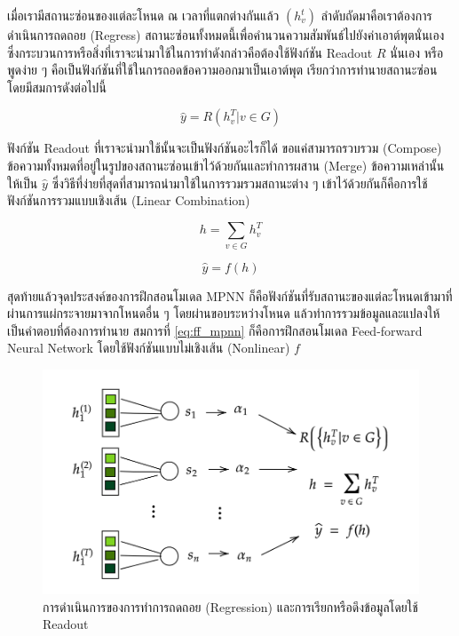 เมื่อเรามีสถานะซ่อนของแต่ละโหนด ณ เวลาที่แตกต่างกันแล้ว $(h^{t}_{v})$ ลำดับถัดมาคือเราต้องการดำเนินการถดถอย (Regress) สถานะซ่อนทั้งหมดนี้เพื่อคำนวนความสัมพันธ์ไปยังค่าเอาต์พุตนั่นเอง ซึ่งกระบวนการหรือสิ่งที่เราจะนำมาใช้ในการทำดังกล่าวคือต้องใช้ฟังก์ชัน Readout $R$ นั่นเอง หรือพูดง่าย ๆ คือเป็นฟังก์ชันที่ใช้ในการถอดข้อความออกมาเป็นเอาต์พุต เรียกว่าการทำนายสถานะซ่อน โดยมีสมการดังต่อไปนี้

\begin{equation}
    \hat{y} = R({h^{T}_{v} | v \in G})
\end{equation}

\noindent ฟังก์ชัน Readout ที่เราจะนำมาใช้นั้นจะเป็นฟังก์ชันอะไรก็ได้ ขอแค่สามารถรวบรวม (Compose) ข้อความทั้งหมดที่อยู่ในรูปของสถานะซ่อนเข้าไว้ด้วยกันและทำการผสาน (Merge) ข้อความเหล่านั้นให้เป็น $\hat{y}$ ซึ่งวิธีที่ง่ายที่สุดที่สามารถนำมาใช้ในการรวมรวมสถานะต่าง ๆ เข้าไว้ด้วยกันก็คือการใช้ฟังก์ชันการรวมแบบเชิงเส้น (Linear Combination)

\begin{equation}
    h = \sum_{v \in G} h^{T}_{v}
\end{equation}

\begin{equation}\label{eq:ff_mpnn}
    \hat{y} = f(h)
\end{equation}

สุดท้ายแล้วจุดประสงค์ของการฝึกสอนโมเดล MPNN ก็คือฟังก์ชันที่รับสถานะของแต่ละโหนดเข้ามาที่ผ่านการแผ่กระจายมาจากโหนดอื่น ๆ โดยผ่านขอบระหว่างโหนด แล้วทำการรวมข้อมูลและแปลงให้เป็นคำตอบที่ต้องการทำนาย สมการที่ \eqref{eq:ff_mpnn} ก็คือการฝึกสอนโมเดล Feed-forward Neural Network โดยใช้ฟังก์ชันแบบไม่เชิงเส้น (Nonlinear) $f$

\begin{figure}[H]
    \centering
    \includegraphics[width=0.8\linewidth]{fig/mp-operation.png}
    \caption{การดำเนินการของการทำการถดถอย (Regression) และการเรียกหรือดึงข้อมูลโดยใช้ Readout}
    \label{fig:mp_operation}
\end{figure}

